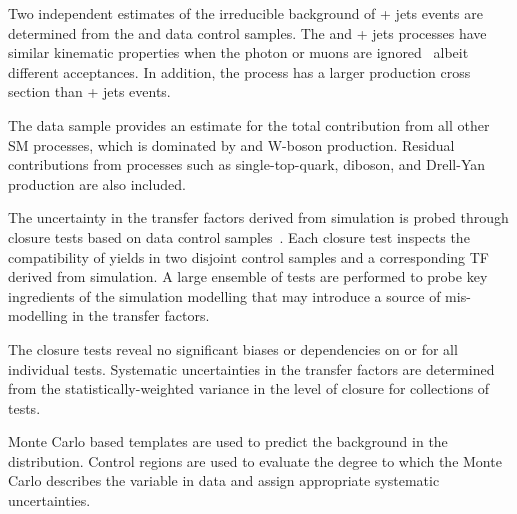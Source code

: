Two independent estimates of the irreducible background of \znunu +
jets events are determined from the \gj and \mmj data control samples.
The \gj and \zmumu + jets processes have similar kinematic properties
when the photon or muons are ignored~\cite{Bern:2011pa} albeit
different acceptances. In addition, the \gj process has a larger
production cross section than \znunu + jets events.

The \mj data sample provides an estimate for the total
contribution from all other SM processes, which is dominated by \ttbar
and W-boson production. Residual contributions from processes such as
single-top-quark, diboson, and Drell-Yan production are also included.

The uncertainty in the transfer factors derived from simulation is
probed through closure tests based on data control
samples~\cite{RA1Paper2012}. Each closure test inspects the
compatibility of yields in two disjoint control samples and a corresponding TF
derived from simulation. A large ensemble of tests are performed to
probe key ingredients of the simulation modelling that may introduce a
source of mis-modelling in the transfer factors.

The closure tests reveal no significant biases or dependencies on
\njet or \scalht for all individual tests. Systematic uncertainties in
the transfer factors are determined from the statistically-weighted
variance in the level of closure for collections of
tests.

Monte Carlo based templates are used to predict the background in the \mht distribution. Control regions are used to evaluate the degree to which the Monte Carlo describes the variable in data and assign appropriate systematic uncertainties.

